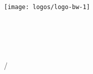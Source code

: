 
\newpage
\thispagestyle{empty}
{
\begin{center}
\textsc{\LARGE \BookEditionText}\\[2ex]
\texttt{[image: logos/logo-bw-1]}\\[2.0ex]
\HRule{0.4ex}\\[15pt]
{ \fontsize{40}{60}   \bfseries \MakeUppercase{\BookTitle}}\\
\HRule{0.4ex}\\[0.7ex]
{\fontsize{25}{30} \textsc{\BookSubTitle}}\\[0.5ex]
\vfill
{\fontsize{20}{0} \textsc{\BookAuthor} }\\%

\vfill
{\fontsize{20}{0} \textsc{\BookLocalCity/\BookLocalState}}\\[0.4ex]
{\fontsize{20}{0} \textsc{\BookEditionYear}}
\end{center}
}


